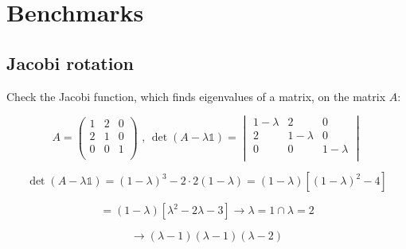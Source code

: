 \documentclass[11pt]{article}
\begin{document}
\section*{Benchmarks}

\subsection*{Jacobi rotation}

\begin{flushleft}
Check the Jacobi function, which finds eigenvalues of a matrix, on the matrix $A$:

\begin{equation*}
A = 
\begin{pmatrix}
1 & 2 & 0\\
2 & 1 & 0\\
0 & 0 & 1\\
\end{pmatrix} \text{ , }
\det (A - \lambda \mathbb{1} ) = 
\begin{vmatrix}
1 - \lambda & 2 & 0\\
2 & 1 - \lambda & 0\\
0 & 0 & 1- \lambda\\
\end{vmatrix}
\end{equation*}

$$
\det (A - \lambda \mathbb{1} ) =
(1-\lambda)^3 - 2 \cdot 2(1 - \lambda) = (1 - \lambda)[(1 - \lambda)^2 - 4]
$$

$$
= (1 - \lambda)[\lambda^2 - 2\lambda - 3] \rightarrow \lambda = 1 \cap \lambda = 2
$$

$$
\rightarrow (\lambda - 1)(\lambda - 1)(\lambda - 2)
$$

\end{flushleft}
\end{document}
